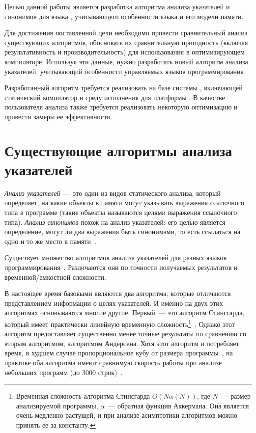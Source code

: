 \documentclass[14pt,titlepage,draft]{extarticle}
\newcommand{\java}{\eng{Java}\xspace}
\begin{document}
    Целью данной работы является разработка алгоритма анализа указателей и
    синонимов для языка \java, учитывающего особенности языка и его модели
    памяти.

    Для достижения поставленной цели необходимо провести сравнительный анализ
    существующих алгоритмов, обосновать их сравнительную пригодность (включая
    результативность и производительность) для использования в оптимизирующем
    компиляторе. Используя эти данные, нужно разработать новый алгоритм анализа
    указателей, учитывающий особенности управляемых языков программирования.

    Разработанный алгоритм требуется реализовать на базе системы , включающей статический компилятор и среду
    исполнения для платформы . В качестве пользователя анализа
    также требуется реализовать некоторую оптимизацию и провести замеры ее
    эффективности.

  \section{Существующие алгоритмы анализа указателей}

    \emph{Анализ указателей}~--- это один из видов статического анализа,
    который определяет, на какие объекты в памяти могут указывать выражения
    ссылочного типа в программе (такие объекты называются целями выражения
    ссылочного типа). \emph{Анализ синонимов} похож на анализ указателей: его
    целью является определение, могут ли два выражения быть синонимами, то есть
    ссылаться на одно и то же место в памяти~\cite{andersen}.

    Существует множество алгоритмов анализа указателей для разных языков
    программирования~\cite{hind_pointer_analysis_not_solved_yet}. Различаются
    они по точности получаемых результатов и временной/емкостной сложности.

    В настоящее время базовыми являются два алгоритма, которые отличаются
    представлением информации о целях указателей. И именно на двух этих
    алгоритмах основываются многие другие.
    Первый~--- это алгоритм Стинсгарда, который имеет
    практически линейную временную сложность\footnote{
      Временная сложность алгоритма Стинсгарда
      $O(N \alpha(N))$, где $N$~--- размер анализируемой программы,
      $\alpha$~--- обратная функция Аккермана. Она является очень медленно
      растущей, и при анализе асимптотики алгоритмов можно принять ее за
      константу.
    }~\cite{steensgaard}. Однако этот алгоритм предоставляет существенно менее
    точные результаты по сравнению со вторым алгоритмом, алгоритмом
    Андерсена. Хотя этот алгоритм и потребляет время, в худшем случае
    пропорциональное кубу от размера программы~\cite{andersen}, на практике оба
    алгоритма имеют сравнимую скорость работы при анализе небольших программ
    (до \num{3000} строк)~\cite{shapiro_fast_and_accurate}.
\end{document}
